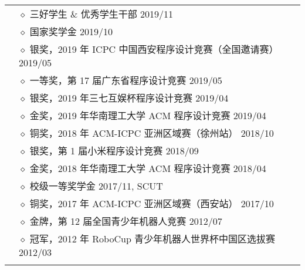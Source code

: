 \documentclass[letterpaper, 10pt]{article}
\begin{document}
\begin{longtable}{p{0.7in}p{6.0in}}
& $\diamond$ 三好学生 \& 优秀学生干部 \hfill 2019/11 \\

& $\diamond$ 国家奖学金 \hfill 2019/10 \\

& $\diamond$ 银奖，2019 年 ICPC 中国西安程序设计竞赛（全国邀请赛） \hfill 2019/05 \\

& $\diamond$ 一等奖，第 17 届广东省程序设计竞赛 \hfill 2019/05 \\

& $\diamond$ 银奖，2019 年三七互娱杯程序设计竞赛 \hfill 2019/04 \\

& $\diamond$ 金奖，2019 年华南理工大学 ACM 程序设计竞赛 \hfill 2019/04 \\

& $\diamond$ 铜奖，2018 年 ACM-ICPC 亚洲区域赛（徐州站） \hfill 2018/10 \\

& $\diamond$ 银奖，第 1 届小米程序设计竞赛 \hfill 2018/09 \\

& $\diamond$ 金奖，2018 年华南理工大学 ACM 程序设计竞赛 \hfill 2018/04 \\

& $\diamond$ 校级一等奖学金 \hfill 2017/11, SCUT \\

& $\diamond$ 铜奖，2017 年 ACM-ICPC 亚洲区域赛（西安站） \hfill 2017/10 \\

& $\diamond$ 金牌，第 12 届全国青少年机器人竞赛 \hfill 2012/07\\

& $\diamond$ 冠军，2012 年 RoboCup 青少年机器人世界杯中国区选拔赛 \hfill 2012/03 \\

& \\




\end{longtable}
\end{document}
